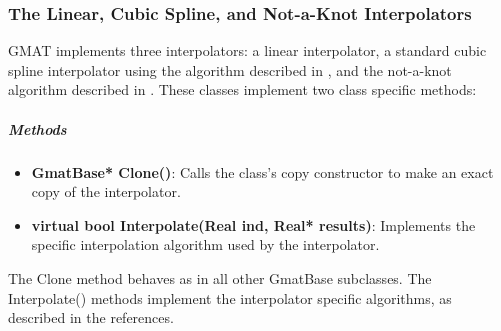 \subsubsection{The Linear, Cubic Spline, and Not-a-Knot Interpolators}

GMAT implements three interpolators: a linear interpolator, a standard cubic spline interpolator
using the algorithm described in \cite{recipes}, and the not-a-knot algorithm described in
\cite{mathSpec}.  These classes implement two class specific methods:

\subparagraph{Methods}

\begin{itemize}
\item \textbf{GmatBase* Clone()}:  Calls the class's copy constructor to make an exact copy of the
interpolator.
\item \textbf{virtual bool Interpolate(Real ind, Real* results)}: Implements the specific
interpolation algorithm used by the interpolator.
\end{itemize}

\noindent The Clone method behaves as in all other GmatBase subclasses.  The Interpolate() methods
implement the interpolator specific algorithms, as described in the references.
